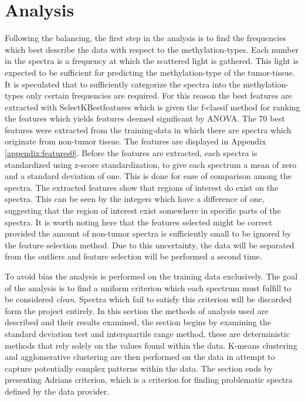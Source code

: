\section{Analysis}

Following the balancing, the first step in the analysis is to find the frequencies which best describe the data with respect to the methylation-types. Each number in the spectra is a frequency at which the scattered light is gathered. This light is expected to be sufficient for predicting the methylation-type of the tumor-tissue. It is speculated that to sufficiently categorize the spectra into the methylation-types only certain frequencies are required. For this reason the best features are extracted with SelectKBestfeatures \cite{scikit} which is given the f-classif method for ranking the features which yields features deemed significant by ANOVA. The 70 best features were extracted from the training-data in which there are spectra which originate from non-tumor tissue. The features are displayed in Appendix \ref{appendix:features0}. Before the features are extracted, each spectra is standardized using z-score standardization, to give each spectrum a mean of zero and a standard deviation of one. This is done for ease of comparison among the spectra. The extracted features show that regions of interest do exist on the spectra. This can be seen by the integers which have a difference of one, suggesting that the region of interest exist somewhere in specific parts of the spectra. It is worth noting here that the features selected might be correct provided the amount of non-tumor spectra is sufficiently small to be ignored by the feature selection method. Due to this uncertainty, the data will be separated from the outliers and feature selection will be performed a second time.

To avoid bias the analysis is performed on the training data exclusively. The goal of the analysis is to find a uniform criterion which each spectrum must fulfill to be considered \textit{clean}. Spectra which fail to satisfy this criterion will be discarded form the project entirely. In this section the methods of analysis used are described and their results examined, the section begins by examining the standard deviation test and interquartile range method, these are deterministic methods that rely solely on the values found within the data. K-means clustering and agglomerative clustering are then performed on the data in attempt to capture potentially complex patterns within the data. The section ends by presenting Adrians criterion, which is a criterion for finding problematic spectra defined by the data provider.

